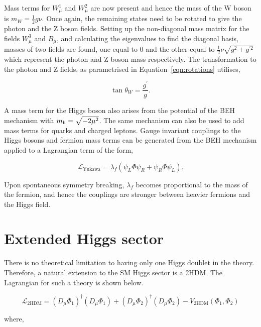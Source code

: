 Mass terms for $W_{\mu}^{1}$ and $W_{\mu}^{2}$ are now present and hence the mass of the W boson is $m_W = \frac{1}{2}g\nu$.
Once again, the remaining states need to be rotated to give the photon and the Z boson fields.
Setting up the non-diagonal mass matrix for the fields $W_{\mu}^{3}$ and $B_{\mu}$, and calculating the eigenvalues to find the diagonal basis, masses of two fields are found, one equal to 0 and the other equal to $\frac{1}{2} \nu \sqrt{g^2 + g^{\prime 2}}$ which represent the photon and Z boson mass respectively.
The transformation to the photon and Z fields, as parametrised in Equation~\ref{eqn:rotations} utilises,

\begin{equation}
\tan\theta_W = \frac{g^{\prime}}{g}.
\end{equation}

A mass term for the Higgs boson also arises from the potential of the \ac{BEH} mechanism with $m_{{\text{h}}} = \sqrt{-2\mu^2}$. 
The same mechanism can also be used to add mass terms for quarks and charged leptons.
Gauge invariant couplings to the Higgs bosons and fermion mass terms can be generated from the \ac{BEH} mechanism applied to a Lagrangian term of the form,

\begin{equation}
\mathcal{L}_{\text{Yukawa}} = \lambda_f (\bar{\psi}_{L}\Phi\psi_{R} + \bar{\psi}_{R}\Phi\psi_{L}).
\end{equation}

Upon spontaneous symmetry breaking, $\lambda_{f}$ becomes proportional to the mass of the fermion, and hence the couplings are stronger between heavier fermions and the Higgs field.

\section{Extended Higgs sector}

There is no theoretical limitation to having only one Higgs doublet in the theory.
Therefore, a natural extension to the \ac{SM} Higgs sector is a \ac{2HDM}.
The Lagrangian for such a theory is shown below.

\begin{equation}
\mathcal{L}_{\text{2HDM}} = (D_\mu \Phi_1)^{\dagger} (D_\mu \Phi_1) + (D_\mu \Phi_2)^{\dagger} (D_\mu \Phi_2) - V_{\text{2HDM}}(\Phi_1 ,\Phi_2)
\end{equation}

where,

